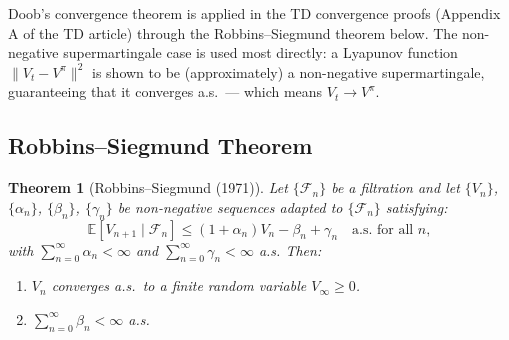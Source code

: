 \documentclass[11pt,a4paper]{article}
\theoremstyle{definition}
\theoremstyle{plain}
\newtheorem{theorem}{Theorem}[section]
\theoremstyle{remark}
\newcommand{\E}{\mathbb{E}}
\begin{document}
\begin{rlconnection}[Connection to RL]
Doob's convergence theorem is applied in the TD convergence proofs (Appendix A of the TD article) through the Robbins--Siegmund theorem below. The non-negative supermartingale case is used most directly: a Lyapunov function $\|V_t - V^\pi\|^2$ is shown to be (approximately) a non-negative supermartingale, guaranteeing that it converges a.s.\ --- which means $V_t \to V^\pi$.
\end{rlconnection}

\subsection{Robbins--Siegmund Theorem}
\label{subsec:robbins_siegmund}

\begin{keyresult}
\begin{theorem}[Robbins--Siegmund (1971)]
\label{thm:robbins_siegmund}
Let $\{\mathcal{F}_n\}$ be a filtration and let $\{V_n\}$, $\{\alpha_n\}$, $\{\beta_n\}$, $\{\gamma_n\}$ be non-negative sequences adapted to $\{\mathcal{F}_n\}$ satisfying:
\begin{equation}
    \E[V_{n+1} \mid \mathcal{F}_n] \leq (1 + \alpha_n) V_n - \beta_n + \gamma_n \quad \text{a.s.\ for all } n,
    \label{eq:robbins_siegmund}
\end{equation}
with $\sum_{n=0}^\infty \alpha_n < \infty$ and $\sum_{n=0}^\infty \gamma_n < \infty$ a.s. Then:
\begin{enumerate}[nosep]
    \item $V_n$ converges a.s.\ to a finite random variable $V_\infty \geq 0$.
    \item $\sum_{n=0}^\infty \beta_n < \infty$ a.s.
\end{enumerate}
\end{theorem}
\end{keyresult}
\end{document}
